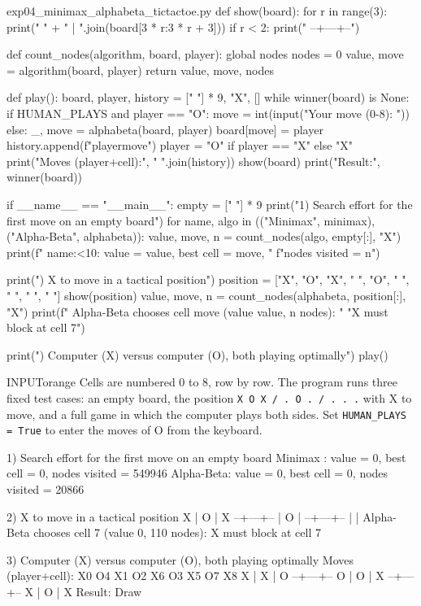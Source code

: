 \documentclass[11pt,a4paper]{article}
\newenvironment{inputbox}{\begin{secbox}{INPUT}{orange}}{\end{secbox}}
\begin{document}
\begin{pycode}{exp04\_minimax\_alphabeta\_tictactoe.py}
def show(board):
    for r in range(3):
        print("   " + " | ".join(board[3 * r:3 * r + 3]))
        if r < 2:
            print("   --+---+--")


def count_nodes(algorithm, board, player):
    global nodes
    nodes = 0
    value, move = algorithm(board, player)
    return value, move, nodes


def play():
    board, player, history = [" "] * 9, "X", []
    while winner(board) is None:
        if HUMAN_PLAYS and player == "O":
            move = int(input("Your move (0-8): "))
        else:
            _, move = alphabeta(board, player)
        board[move] = player
        history.append(f"{player}{move}")
        player = "O" if player == "X" else "X"
    print("Moves (player+cell):", " ".join(history))
    show(board)
    print("Result:", winner(board))


if __name__ == "__main__":
    empty = [" "] * 9
    print("1) Search effort for the first move on an empty board")
    for name, algo in (("Minimax", minimax), ("Alpha-Beta", alphabeta)):
        value, move, n = count_nodes(algo, empty[:], "X")
        print(f"   {name:<10}: value = {value}, best cell = {move}, "
              f"nodes visited = {n}")

    print(") X to move in a tactical position")
    position = ["X", "O", "X",
                " ", "O", " ",
                " ", " ", " "]
    show(position)
    value, move, n = count_nodes(alphabeta, position[:], "X")
    print(f"   Alpha-Beta chooses cell {move} (value {value}, {n} nodes): "
          "X must block at cell 7")

    print(") Computer (X) versus computer (O), both playing optimally")
    play()
\end{pycode}

\begin{inputbox}
Cells are numbered 0 to 8, row by row. The program runs three fixed test cases: an empty board, the position \texttt{X O X / . O . / . . .} with X to move, and a full game in which the computer plays both sides. Set \texttt{HUMAN\_PLAYS = True} to enter the moves of O from the keyboard.
\end{inputbox}

\begin{outputbox}
1) Search effort for the first move on an empty board
   Minimax   : value = 0, best cell = 0, nodes visited = 549946
   Alpha-Beta: value = 0, best cell = 0, nodes visited = 20866

2) X to move in a tactical position
   X | O | X
   --+---+--
     | O |
   --+---+--
     |   |
   Alpha-Beta chooses cell 7 (value 0, 110 nodes): X must block at cell 7

3) Computer (X) versus computer (O), both playing optimally
Moves (player+cell): X0 O4 X1 O2 X6 O3 X5 O7 X8
   X | X | O
   --+---+--
   O | O | X
   --+---+--
   X | O | X
Result: Draw
\end{outputbox}
\end{document}
